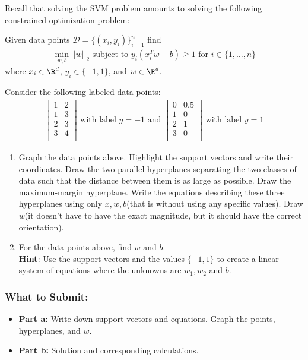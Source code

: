 \documentclass{article}
\begin{document}
\begin{aprob}
    Recall that solving the SVM problem amounts to solving the following constrained optimization problem:
    \begin{center}
        Given data points $\mathcal{D} = \{(x_i, y_i)\}^n_{i=1}$ find
        \begin{align*}
            \min_{w, b} ||w||_2 \text{ subject to } y_i(x_i^Tw - b) \geq 1 \text{ for } i \in \{1, \dots, n\}
        \end{align*}
        where $x_i \in \R^d$, $y_i \in \{-1, 1\}$, and $w \in \R^d$.
    \end{center}
    Consider the following labeled data points:
    \begin{align*}
        \begin{bmatrix}
        1 & 2 \\
        1 & 3 \\
        2 & 3 \\
        3 & 4 \\
        \end{bmatrix} \text{ with label } y=-1 \text{ and } \begin{bmatrix}
        0 & 0.5 \\
        1 & 0 \\
        2 & 1 \\
        3 & 0 \\
        \end{bmatrix} \text{ with label } y=1
    \end{align*}
    \begin{enumerate}
        \item {} Graph the data points above. Highlight the support vectors and write their coordinates. Draw the two parallel hyperplanes separating the two classes of data such that the distance between them is as large as possible. Draw the maximum-margin hyperplane. Write the equations describing these three hyperplanes using only $x, w, b$(that is without using any specific values). Draw $w$(it doesn't have to have the exact magnitude, but it should have the correct orientation).
        
        \item {} For the data points above, find $w$ and $b$. \\
        
        \textbf{Hint}: Use the support vectors and the values $\{-1, 1\}$ to create a linear system of equations where the unknowns are $w_1, w_2$ and $b$.
    
    \end{enumerate}
    \subsubsection*{What to Submit:}
    \begin{itemize}
        \item \textbf{Part a:} Write down support vectors and equations. Graph the points, hyperplanes, and $w$.
        \item \textbf{Part b:} Solution and corresponding calculations.
    \end{itemize}
\end{aprob}
\end{document}
